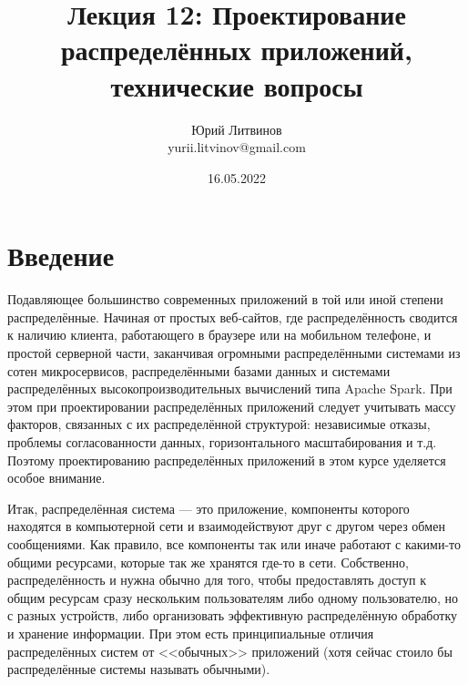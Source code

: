 \documentclass[a5paper]{article}
\title{Лекция 12: Проектирование распределённых приложений, технические вопросы}
\author{Юрий Литвинов\\\small{yurii.litvinov@gmail.com}}
\date{16.05.2022}
\begin{document}
\maketitle
\thispagestyle{empty}

\section{Введение}

Подавляющее большинство современных приложений в той или иной степени распределённые. Начиная от простых веб-сайтов, где распределённость сводится к наличию клиента, работающего в браузере или на мобильном телефоне, и простой серверной части, заканчивая огромными распределёнными системами из сотен микросервисов, распределёнными базами данных и системами распределённых высокопроизводительных вычислений типа Apache Spark. При этом при проектировании распределённых приложений следует учитывать массу факторов, связанных с их распределённой структурой: независимые отказы, проблемы согласованности данных, горизонтального масштабирования и т.д. Поэтому проектированию распределённых приложений в этом курсе уделяется особое внимание.

Итак, распределённая система --- это приложение, компоненты которого находятся в компьютерной сети и взаимодействуют друг с другом через обмен сообщениями. Как правило, все компоненты так или иначе работают с какими-то общими ресурсами, которые так же хранятся где-то в сети. Собственно, распределённость и нужна обычно для того, чтобы предоставлять доступ к общим ресурсам сразу нескольким пользователям либо одному пользователю, но с разных устройств, либо организовать эффективную распределённую обработку и хранение информации. При этом есть принципиальные отличия распределённых систем от <<обычных>> приложений (хотя сейчас стоило бы распределённые системы называть обычными).
\end{document}
